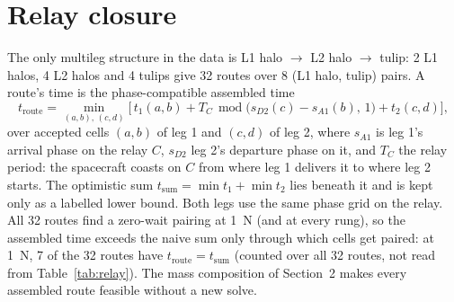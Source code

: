 \documentclass[11pt]{article}
\begin{document}
\section{Relay closure}\label{sec:relay}
The only multileg structure in the data is L1 halo $\to$ L2 halo $\to$ tulip: 2 L1 halos, 4 L2
halos and 4 tulips give 32 routes over 8 (L1 halo, tulip) pairs. A route's time is the
phase-compatible assembled time
\[
t_{\mathrm{route}} = \min_{(a,b),\,(c,d)} \Big[\, t_1(a,b) + T_C \,\operatorname{mod}\!\big(s_{D2}(c) - s_{A1}(b),\, 1\big) + t_2(c,d) \Big],
\]
over accepted cells $(a,b)$ of leg 1 and $(c,d)$ of leg 2, where $s_{A1}$ is leg 1's arrival phase
on the relay $C$, $s_{D2}$ leg 2's departure phase on it, and $T_C$ the relay period: the spacecraft
coasts on $C$ from where leg 1 delivers it to where leg 2 starts. The optimistic sum
$t_{\mathrm{sum}} = \min t_1 + \min t_2$ lies beneath it and is kept only as a labelled lower bound.
Both legs use the same phase grid on the relay. All 32 routes find a zero-wait pairing at 1~N (and
at every rung), so the assembled time exceeds the naive sum only through which cells get paired: at
1~N, 7 of the 32 routes have $t_{\mathrm{route}} = t_{\mathrm{sum}}$ (counted over all 32 routes, not read from Table~\ref{tab:relay}). The mass composition of
Section~2 makes every assembled route feasible without a new solve.
\end{document}
